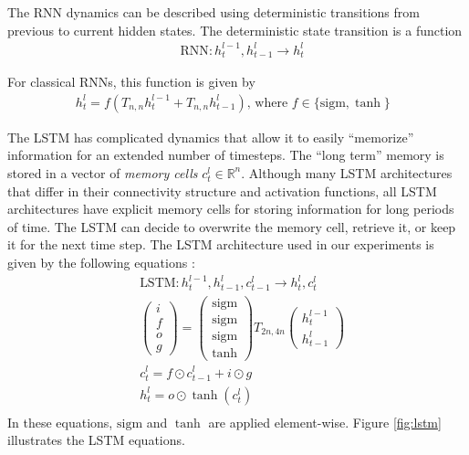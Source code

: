 \documentclass[twoside,11pt,a4paper]{article}
\begin{document}
	The RNN dynamics can be described using deterministic transitions
	from previous to current hidden states. 
	The deterministic state transition is a function
	\begin{align*}
	&\text{RNN} : h^{l-1}_t, h^l_{t-1} \rightarrow h^l_t
	\end{align*}
	
	For classical RNNs, this function is given by
	\begin{align*}
	h^l_t = f(T_{n,n}h^{l-1}_t + T_{n,n}h^l_{t-1}) \text{, where $f \in \{\mathrm{sigm}, \tanh\}$ }
	\end{align*}
	
	The LSTM has complicated dynamics that allow it to
	easily ``memorize'' information for an extended number of timesteps.  The
	``long term'' memory is stored in a vector of \emph{memory cells}
	$c^l_t \in \mathbb{R}^n$.  Although many LSTM architectures
	that differ in their connectivity structure and activation functions,
	all LSTM architectures have explicit memory cells for storing
	information for long periods of time.  The LSTM can decide
	to overwrite the memory cell, retrieve it, or keep it for the next time
	step.  The LSTM architecture used in our experiments is given by the
	following equations \cite{graves2013speech}:
	\begin{align*}
	&\text{LSTM} : h^{l-1}_t, h^l_{t-1}, c^l_{t - 1} \rightarrow h^l_t, c^l_t\\
	&\begin{pmatrix}i\\f\\o\\g\end{pmatrix} =
	\begin{pmatrix}\mathrm{sigm}\\\mathrm{sigm}\\\mathrm{sigm}\\\tanh\end{pmatrix}
	T_{2n,4n}\begin{pmatrix}h^{l - 1}_t\\h^l_{t-1}\end{pmatrix}\\
	&c^l_t = f \odot c^l_{t-1} + i \odot g\\
	&h^l_t = o \odot \tanh(c^l_t)\\
	\end{align*}
	In these equations, $\mathrm{sigm}$ and $\tanh$ are applied
	element-wise. Figure \ref{fig:lstm} illustrates the LSTM
	equations.
	
\end{document}
